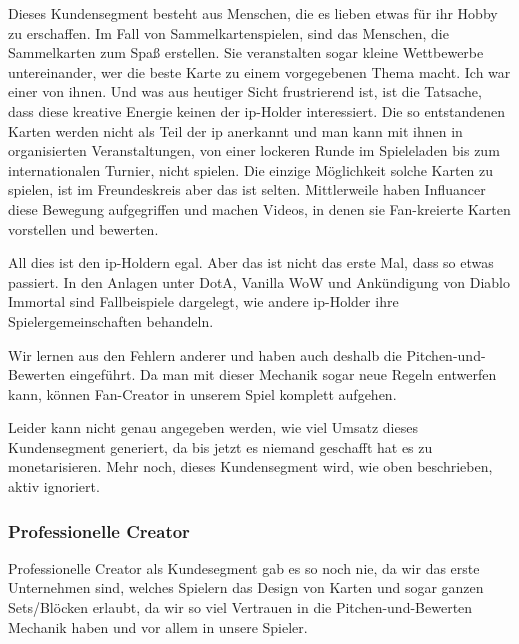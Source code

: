 \documentclass[fontsize=11, a4aper]{scrartcl}
\begin{document}
Dieses Kundensegment besteht aus Menschen, die es lieben etwas für ihr Hobby zu erschaffen. Im Fall von Sammelkartenspielen, sind das Menschen, die Sammelkarten zum Spaß erstellen. Sie veranstalten sogar kleine Wettbewerbe untereinander, wer die beste Karte zu einem vorgegebenen Thema macht. Ich war einer von ihnen. Und was aus heutiger Sicht frustrierend ist, ist die Tatsache, dass diese kreative Energie keinen der \ac{ip}-Holder interessiert. Die so entstandenen Karten werden nicht als Teil der \ac{ip} anerkannt und man kann mit ihnen in organisierten Veranstaltungen, von einer lockeren Runde im Spieleladen bis zum internationalen Turnier, nicht spielen. Die einzige Möglichkeit solche Karten zu spielen, ist im Freundeskreis aber das ist selten. Mittlerweile haben Influancer diese Bewegung aufgegriffen und machen Videos, in denen sie Fan-kreierte Karten vorstellen und bewerten.\hfill\newline

\noindent All dies ist den \ac{ip}-Holdern egal. Aber das ist nicht das erste Mal, dass so etwas passiert. In den Anlagen unter \glqq DotA\grqq, \glqq Vanilla WoW\grqq{} und \glqq Ankündigung von Diablo Immortal\grqq{} sind Fallbeispiele dargelegt, wie andere \ac{ip}-Holder ihre Spielergemeinschaften behandeln.\hfill\newline

\noindent Wir lernen aus den Fehlern anderer und haben auch deshalb die Pitchen-und-Bewerten eingeführt. Da man mit dieser Mechanik sogar neue Regeln entwerfen kann, können Fan-Creator in unserem Spiel komplett aufgehen.\hfill\newline

\noindent Leider kann nicht genau angegeben werden, wie viel Umsatz dieses Kundensegment generiert, da bis jetzt es niemand geschafft hat es zu monetarisieren. Mehr noch, dieses Kundensegment wird, wie oben beschrieben, aktiv ignoriert.


\subsubsection{Professionelle Creator} \label{subsubsec:Professionelle_Creator}

Professionelle Creator als Kundesegment gab es so noch nie, da wir das erste Unternehmen sind, welches Spielern das Design von Karten und sogar ganzen Sets/Blöcken erlaubt, da wir so viel Vertrauen in die Pitchen-und-Bewerten Mechanik haben und vor allem in unsere Spieler.\hfill\newline
\end{document}
